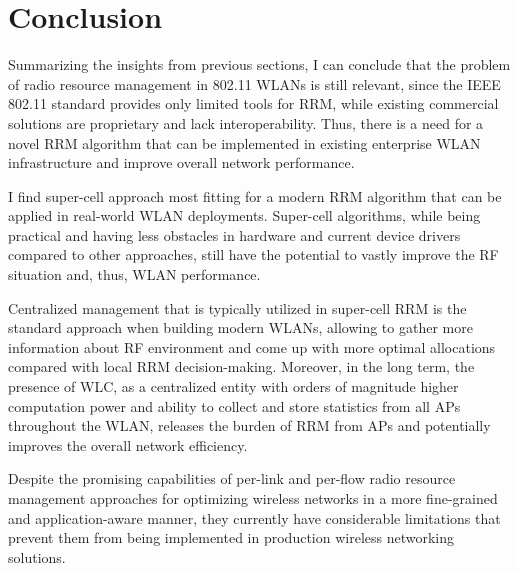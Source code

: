 
\section {Conclusion}
\label{chap:lr:sec:conclusion}
Summarizing the insights from previous sections, I can conclude that the problem of radio resource management in 802.11 WLANs is still relevant, since the IEEE 802.11 standard provides only limited tools for RRM, while existing commercial solutions are proprietary and lack interoperability. Thus, there is a need for a novel RRM algorithm that can be implemented in existing enterprise WLAN infrastructure and improve overall network performance.

I find super-cell approach most fitting for a modern RRM algorithm that can be applied in real-world WLAN deployments. Super-cell algorithms, while being practical and having less obstacles in hardware and current device drivers compared to other approaches, still have the potential to vastly improve the RF situation and, thus, WLAN performance.

Centralized management that is typically utilized in super-cell RRM is the standard approach when building modern WLANs, allowing to gather more information about RF environment and come up with more optimal allocations compared with local RRM decision-making.
Moreover, in the long term, the presence of WLC, as a centralized entity with orders of magnitude higher computation power and ability to collect and store statistics from all APs throughout the WLAN, releases the burden of RRM from APs and potentially improves the overall network efficiency.

Despite the promising capabilities of per-link and per-flow radio resource management approaches for optimizing wireless networks in a more fine-grained and application-aware manner, they currently have considerable limitations that prevent them from being implemented in production wireless networking solutions.

